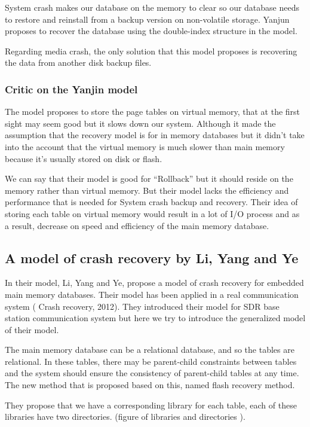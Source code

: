 \documentclass[10pt]{article} %
\begin{document}
System crash makes our database on the memory to clear so our database needs to restore and reinstall from a backup version on non-volatile storage. Yanjun proposes to recover the database using the double-index structure in the model.

Regarding media crash, the only solution that this model proposes is recovering the data from another disk backup files.

\subsubsection{Critic on the Yanjin model}

The model proposes to store the page tables on virtual memory, that at the first sight may seem good but it slows down our system. Although it made the assumption that the recovery model is for in memory databases but it didn’t take into the account that the virtual memory is much slower than main memory because it’s usually stored on disk or flash.

We can say that their model is good for ``Rollback'' but it should reside on the memory rather than virtual memory. But their model lacks the efficiency and performance that is needed for System crash backup and recovery. Their idea of storing each table on virtual memory would result in a lot of I/O process and as a result, decrease on speed and efficiency of the main memory database.

\subsection{A model of crash recovery by Li, Yang and Ye}

In their model, Li, Yang and Ye, propose a model of crash recovery for embedded main memory databases.  Their model has been applied in a real communication system ( Crash recovery, 2012). They introduced their model for SDR base station communication system but here we try to introduce the generalized model of their model.

The main memory database can be a relational database, and so the tables are relational. In these tables, there may be parent-child constraints between tables and the system should ensure the consistency of parent-child tables at any time. The new method that is proposed based on this, named flash recovery method.

They propose that we have a corresponding library for each table, each of these libraries have two directories. (figure of libraries and directories ).
\end{document}
